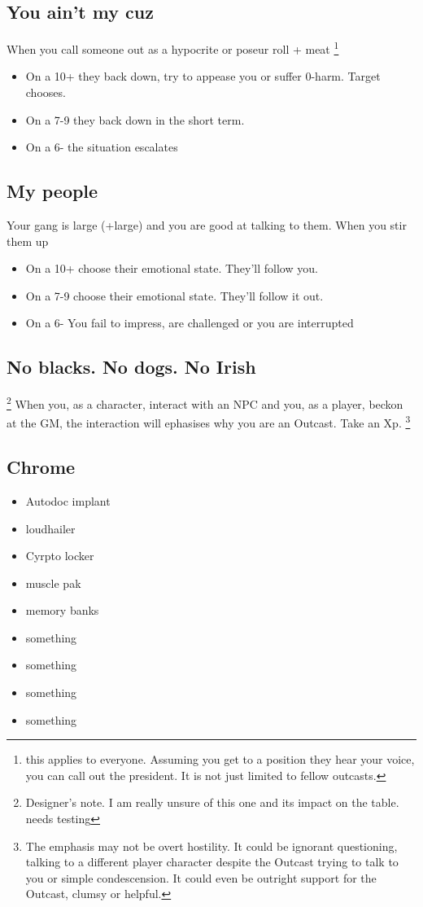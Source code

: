 \documentclass{tufte-book}
\begin{document}
\subsection{You ain't my cuz}
When you call someone out as a hypocrite or poseur {roll + meat} \footnote{this applies to everyone. Assuming you get to a position they hear your voice, you can call out the president. It is not just limited to fellow outcasts.}
\begin{itemize}
\item On a 10+ they back down, try to appease you or suffer 0-harm. Target chooses.
\item On a 7-9 they back down in the short term.
\item On a 6- the situation escalates
\end{itemize}

\subsection{My people}
Your gang is large (+large) and you are good at talking to them. When you stir them up 
\begin{itemize}
\item On a 10+ choose their emotional state. They'll follow you.
\item On a 7-9 choose their emotional state. They'll follow it out.
\item On a 6- You fail to impress, are challenged or you are interrupted
\end{itemize}

\subsection{No blacks. No dogs. No Irish}\footnote{Designer's note. I am really unsure of this one and its impact on the table. needs testing} 
When you, as a character, interact with an NPC and you, as a player, beckon at the GM, the interaction will ephasises why you are an Outcast. Take an Xp. 
\footnote {The emphasis may not be overt hostility. It could be ignorant questioning, talking to a different player character despite the Outcast trying to talk to you or simple condescension. It could even be outright support for the Outcast, clumsy or helpful.}

\subsection{Chrome}
\begin{multicols}{3}
\begin{itemize}
\item Autodoc implant
\item loudhailer
\item Cyrpto locker
\item muscle pak
\item memory banks
\item something
\item something
\item something
\item something
\end{itemize}
\end{multicols}
\end{document}
